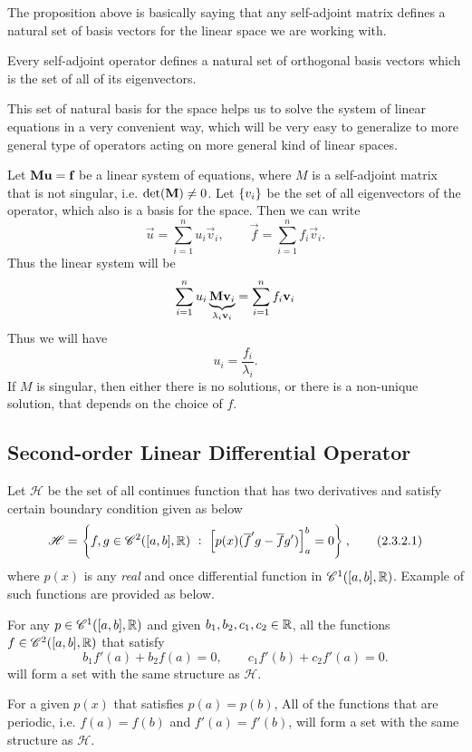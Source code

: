 The proposition above is basically saying that any self-adjoint matrix defines a natural set of basis vectors for the linear space we are working with.
\begin{observation}
	Every self-adjoint operator defines a natural set of orthogonal basis vectors which is the set of all of its eigenvectors.
\end{observation}
This set of natural basis for the space helps us to solve the system of linear equations in a very convenient way, which will be very easy to generalize to more general type of operators acting on more general kind of linear spaces. 
\begin{observation}
	Let $\textbf{M}\textbf{u} = \textbf{f}$ be a linear system of equations, where $M$ is a self-adjoint matrix that is not singular, i.e. $\det(\textbf{M}) \neq 0$. Let $\{v_i\}$ be the set of all eigenvectors of the operator, which also is a basis for the space. Then we can write
	\[ \vec{u} = \sum_{i=1}^{n} u_i \vec{v}_i, \qquad \vec{f} =\sum_{i=1}^{n} f_i \vec{v}_i. \]
	Thus the linear system will be
	\[ \sum_{i=1}^{n}u_i \underbrace{\textbf{M}\textbf{v}_i}_{\lambda_i\textbf{v}_i} =\sum_{i=1}^{n} f_i \textbf{v}_i  \]
	Thus we will have
	\[ u_i = \frac{f_i}{\lambda_i}. \]
	If $M$ is singular, then either there is no solutions, or there is a non-unique solution, that depends on the choice of $f$.
\end{observation}

\subsection{Second-order Linear Differential Operator}
Let $\mathscr{H}$ be the set of all continues function that has two derivatives and satisfy certain boundary condition given as below
\[ \mathscr{H} = \left\{ f,g \in \mathscr{C}^2([a,b],\mathbb{R})\ :\ \left[ p(x)(\overline{f}'g - \overline{f}g') \right]_a^b = 0 \right\}, \tag{2.3.2.1} \]
where $p(x)$ is any \emph{real} and once differential function in $\mathscr{C}^1([a,b],\mathbb{R})$. Example of such functions are provided as below.
\begin{example}
	For any $p \in \mathscr{C}^1([a,b],\mathbb{R})$ and given $b_1, b_2, c_1, c_2 \in \mathbb{R}$, all the functions $f\in \mathscr{C}^2([a,b],\mathbb{R})$ that satisfy
	\[ b_1f'(a) + b_2f(a)=0,\qquad c_1f'(b) + c_2f'(a) =0. \]
	will form a set with the same structure as $\mathscr{H}$.
\end{example}
 
 \begin{example}
 	For a given $p(x)$ that satisfies $p(a) = p(b)$, All of the functions that are periodic, i.e. $f(a)=f(b)$ and $f'(a) = f'(b)$, will form a set with the same structure as $\mathscr{H}$.
 \end{example}
 
